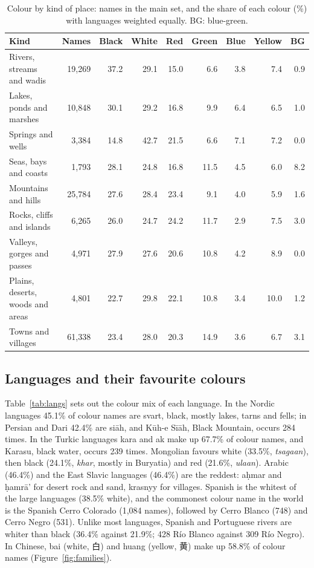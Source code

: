 \documentclass[11pt,a4paper]{article}
\begin{document}
\begin{table}[tbp]\centering\footnotesize\caption{Colour by kind of place: names in the main set, and the share of each colour (\%) with languages weighted equally. BG: blue-green.}\label{tab:kinds}\begin{tabular}{lrrrrrrrr}\toprule Kind & Names & Black & White & Red & Green & Blue & Yellow & BG\\\midrule
Rivers, streams and wadis & 19,269 & 37.2 & 29.1 & 15.0 & 6.6 & 3.8 & 7.4 & 0.9\\
Lakes, ponds and marshes & 10,848 & 30.1 & 29.2 & 16.8 & 9.9 & 6.4 & 6.5 & 1.0\\
Springs and wells & 3,384 & 14.8 & 42.7 & 21.5 & 6.6 & 7.1 & 7.2 & 0.0\\
Seas, bays and coasts & 1,793 & 28.1 & 24.8 & 16.8 & 11.5 & 4.5 & 6.0 & 8.2\\
Mountains and hills & 25,784 & 27.6 & 28.4 & 23.4 & 9.1 & 4.0 & 5.9 & 1.6\\
Rocks, cliffs and islands & 6,265 & 26.0 & 24.7 & 24.2 & 11.7 & 2.9 & 7.5 & 3.0\\
Valleys, gorges and passes & 4,971 & 27.9 & 27.6 & 20.6 & 10.8 & 4.2 & 8.9 & 0.0\\
Plains, deserts, woods and areas & 4,801 & 22.7 & 29.8 & 22.1 & 10.8 & 3.4 & 10.0 & 1.2\\
Towns and villages & 61,338 & 23.4 & 28.0 & 20.3 & 14.9 & 3.6 & 6.7 & 3.1\\
\bottomrule\end{tabular}\end{table}

\subsection{Languages and their favourite colours}
Table~\ref{tab:langs} sets out the colour mix of each language. In the Nordic languages 45.1\% of colour names are svart, black, mostly lakes, tarns and fells; in Persian and Dari 42.4\% are siāh, and Kūh-e Sīāh, Black Mountain, occurs 284 times. In the Turkic languages kara and ak make up 67.7\% of colour names, and Karasu, black water, occurs 239 times. Mongolian favours white (33.5\%, \textit{tsagaan}), then black (24.1\%, \textit{khar}, mostly in Buryatia) and red (21.6\%, \textit{ulaan}). Arabic (46.4\%) and the East Slavic languages (46.4\%) are the reddest: aḥmar and ḥamrā’ for desert rock and sand, krasnyy for villages. Spanish is the whitest of the large languages (38.5\% white), and the commonest colour name in the world is the Spanish Cerro Colorado (1,084 names), followed by Cerro Blanco (748) and Cerro Negro (531). Unlike most languages, Spanish and Portuguese rivers are whiter than black (36.4\% against 21.9\%; 428 Río Blanco against 309 Río Negro). In Chinese, bai (white, {\cjk 白}) and huang (yellow, {\cjk 黄}) make up 58.8\% of colour names (Figure~\ref{fig:families}).
\end{document}
